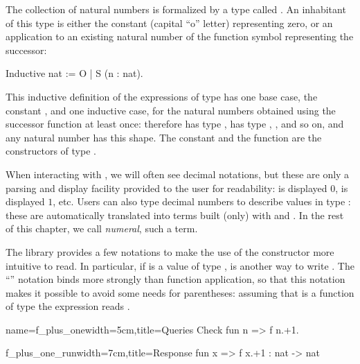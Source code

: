 The collection of natural numbers is formalized by a type called
. An inhabitant of this type is either the constant 
(capital ``o'' letter) representing zero, or an
application to an existing natural number of the function symbol 
representing the successor:

\begin{coq}{}{}
Inductive nat := O | S (n : nat).
\end{coq}

This inductive definition of the expressions of type  has one
base case, the constant , and one inductive case, for the natural
numbers obtained using the successor function at least once: therefore
 has type ,  has type , , and
so on, and any natural number has this shape. The constant  and
the function  are the constructors of type .

When interacting with
\Coq{}, we will often see decimal
notations, but these are only a parsing and display
facility provided to the user for readability:  is displayed
$0$,  is displayed $1$, etc.  Users can also type decimal
numbers to describe values in type : these are automatically
translated into terms built (only) with  and . In the rest
of this chapter, we call \emph{numeral}, such a term.

The \mcbMC{} library provides a few notations to make the use of the
constructor  more intuitive to read.  In particular, if 
is a value of type ,  is another way to write
.  The ``'' notation binds more strongly than function
application, so that this notation makes it possible to avoid some
needs for parentheses: assuming  that  is a function of type
 the expression  reads
.

\begin{coq}{name=f_plus_one}{width=5cm,title=Queries}
Check fun n => f n.+1.
\end{coq}
\begin{coqout}{f_plus_one_run}{width=7cm,title=Response}
fun x => f x.+1 : nat -> nat
\end{coqout}


